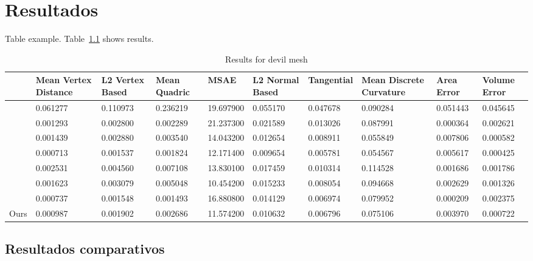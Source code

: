 
\chapter{Resultados}
\label{cha:Resultados}

Table example. Table~\ref{tab:res} shows results. 

\begin{table}[!h]
\caption{Results for devil mesh}
\tiny
\begin{center}
\begin{tabular}{ m{1.1cm} m{0.95cm} m{0.95cm} m{0.95cm} m{0.95cm} m{0.95cm} m{0.95cm} m{0.95cm} m{0.95cm} m{0.95cm} } 
 & Mean Vertex Distance & L2 Vertex Based & Mean Quadric & MSAE & L2 Normal Based & Tangential & Mean Discrete Curvature & Area Error & Volume Error\\ 
 \hline 
\cite{FDC03} & 0.061277 & 0.110973 & 0.236219 & 19.697900 & 0.055170 & 0.047678 & 0.090284 & 0.051443 & 0.045645 \\ 
 \cite{JDD03} & 0.001293 & 0.002800 & 0.002289 & 21.237300 & 0.021589 & 0.013026 & 0.087991 & 0.000364 & 0.002621 \\ 
 \cite{SRML07} & 0.001439 & 0.002880 & 0.003540 & 14.043200 & 0.012654 & 0.008911 & 0.055849 & 0.007806 & 0.000582 \\ 
 \cite{ZFAT11} & \cellcolor{blue!25}0.000713 & \cellcolor{blue!25}0.001537 & 0.001824 & 12.171400 & \cellcolor{blue!25}0.009654 & \cellcolor{blue!25}0.005781 & \cellcolor{blue!25}0.054567 & 0.005617 & \cellcolor{blue!25}0.000425 \\ 
 \cite{HS13} & 0.002531 & 0.004560 & 0.007108 & 13.830100 & 0.017459 & 0.010314 & 0.114528 & 0.001686 & 0.001786 \\ 
 \cite{ZDZBL15} & 0.001623 & 0.003079 & 0.005048 & \cellcolor{blue!25}10.454200 & 0.015233 & 0.008054 & 0.094668 & 0.002629 & 0.001326 \\ 
 \cite{YRP16} & 0.000737 & 0.001548 & \cellcolor{blue!25}0.001493 & 16.880800 & 0.014129 & 0.006974 & 0.079952 & \cellcolor{blue!25}0.000209 & 0.002375 \\ 
 Ours & 0.000987 & 0.001902 & 0.002686 & 11.574200 & 0.010632 & 0.006796 & 0.075106 & 0.003970 & 0.000722 \\ 
 \end{tabular}
\end{center}
 \label{tab:res}
\end{table}

\section{Resultados comparativos}